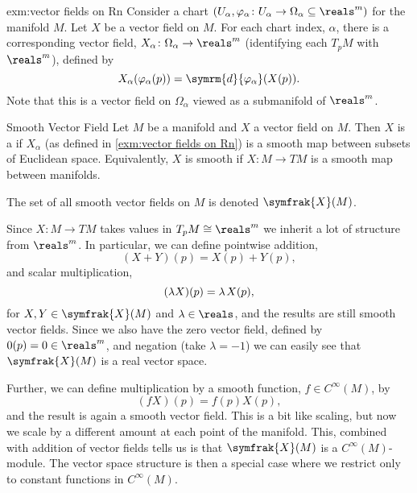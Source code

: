 \documentclass[fleqn]{NotesClass}
\renewcommand{\dl}{\symrm{d}}
\newcommand{\isomorphic}{\cong}
\newcommand{\vectorFields}{\symfrak{X}}
\begin{document}
    \begin{exm}{}{exm:vector fields on Rn}
        Consider a chart \((U_\alpha, \varphi_\alpha \colon U_\alpha \to \Omega_\alpha \subseteq \reals^m)\) for the manifold \(M\).
        Let \(X\) be a vector field on \(M\).
        For each chart index, \(\alpha\), there is a corresponding vector field, \(X_\alpha \colon \Omega_\alpha \to \reals^m\) (identifying each \(T_pM\) with \(\reals^m\)), defined by
        \begin{equation}
            X_\alpha(\varphi_\alpha(p)) = \dl{\varphi_\alpha}(X(p)).
        \end{equation}
        Note that this is a vector field on \(\Omega_\alpha\) viewed as a submanifold of \(\reals^m\).
    \end{exm}
    
    \begin{dfn}{Smooth Vector Field}{}
        Let \(M\) be a manifold and \(X\) a vector field on \(M\).
        Then \(X\) is a  if \(X_\alpha\) (as defined in \cref{exm:vector fields on Rn}) is a smooth map between subsets of Euclidean space.
        Equivalently, \(X\) is smooth if \(X \colon M \to TM\) is a smooth map between manifolds.
        
        The set of all smooth vector fields on \(M\) is denoted \(\vectorFields(M)\). 
    \end{dfn}
    
    Since \(X \colon M \to TM\) takes values in \(T_pM \isomorphic \reals^m\) we inherit a lot of structure from \(\reals^m\).
    In particular, we can define pointwise addition,
    \begin{equation}
        (X + Y)(p) = X(p) + Y(p),
    \end{equation}
    and scalar multiplication,
    \begin{equation}
        (\lambda X)(p) = \lambda \mkern2mu X(p),
    \end{equation}
    for \(X, Y \in \vectorFields(M)\) and \(\lambda \in \reals\), and the results are still smooth vector fields.
    Since we also have the zero vector field, defined by \(0(p) = 0 \in \reals^m\), and negation (take \(\lambda = -1\)) we can easily see that \(\vectorFields(M)\) is a real vector space.
    
    Further, we can define multiplication by a smooth function, \(f \in C^{\infty}(M)\), by
    \begin{equation}
        (fX)(p) = f(p) X(p),
    \end{equation}
    and the result is again a smooth vector field.
    This is a bit like scaling, but now we scale by a different amount at each point of the manifold.
    This, combined with addition of vector fields tells us is that \(\vectorFields(M)\) is a \(C^{\infty}(M)\)-module.
    The vector space structure is then a special case where we restrict only to constant functions in \(C^{\infty}(M)\).
    
\end{document}
